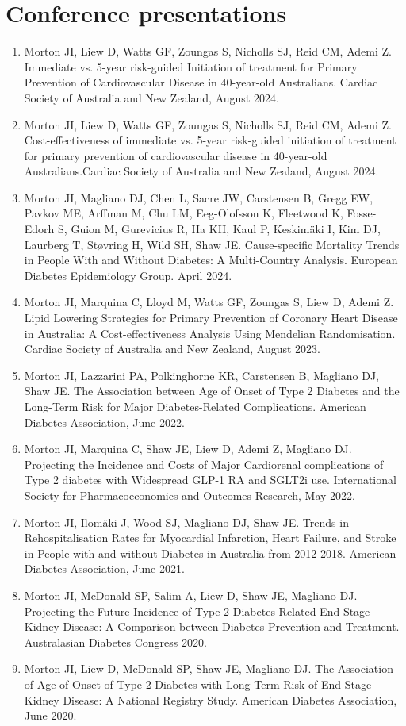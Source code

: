 \documentclass[11pt]{article}
\begin{document}
\section*{Conference presentations}
\begin{enumerate}
\item Morton JI, Liew D, Watts GF, Zoungas S, Nicholls SJ, Reid CM, Ademi Z.
Immediate vs. 5-year risk-guided Initiation of treatment for Primary Prevention of 
Cardiovascular Disease in 40-year-old Australians.
Cardiac Society of Australia and New Zealand, August 2024.
\item Morton JI, Liew D, Watts GF, Zoungas S, Nicholls SJ, Reid CM, Ademi Z.
Cost-effectiveness of immediate vs. 5-year risk-guided initiation of treatment for primary 
prevention of cardiovascular disease in 40-year-old Australians.Cardiac Society of Australia and New Zealand, August 2024.
\item Morton JI, Magliano DJ, Chen L, Sacre JW, Carstensen B, Gregg EW, Pavkov ME, Arffman M, 
Chu LM, Eeg-Olofsson K, Fleetwood K, Fosse-Edorh S, Guion M, Gurevicius R, Ha KH, Kaul P, 
Keskim{\"a}ki I, Kim DJ, Laurberg T, St{\o}vring H, Wild SH, Shaw JE. Cause-specific
Mortality Trends in People With and Without Diabetes: A Multi-Country Analysis. 
European Diabetes Epidemiology Group. April 2024.
\item Morton JI, Marquina C, Lloyd M, Watts GF, Zoungas S, Liew D, Ademi Z. 
Lipid Lowering Strategies for Primary Prevention of Coronary Heart Disease in Australia: 
A Cost-effectiveness Analysis Using Mendelian Randomisation. 
Cardiac Society of Australia and New Zealand, August 2023.
\item Morton JI, Lazzarini PA, Polkinghorne KR, Carstensen B, Magliano DJ, Shaw JE. 
The Association between Age of Onset of Type 2 Diabetes and the Long-Term Risk for Major Diabetes-Related Complications. 
American Diabetes Association, June 2022. 
\item Morton JI, Marquina C, Shaw JE, Liew D, Ademi Z, Magliano DJ. 
Projecting the Incidence and Costs of Major Cardiorenal complications of 
Type 2 diabetes with Widespread GLP-1 RA and SGLT2i use. 
International Society for Pharmacoeconomics and Outcomes Research, May 2022.
\item Morton JI, Ilom{\"a}ki J, Wood SJ, Magliano DJ, Shaw JE. 
Trends in Rehospitalisation Rates for Myocardial Infarction, Heart Failure, and Stroke in People with
and without Diabetes in Australia from 2012-2018. American Diabetes Association, June 2021.
\item Morton JI, McDonald SP, Salim A, Liew D, Shaw JE, Magliano DJ. 
Projecting the Future Incidence of Type 2 Diabetes-Related End-Stage Kidney Disease: 
A Comparison between Diabetes Prevention and Treatment. Australasian Diabetes Congress 2020.
\item Morton JI, Liew D, McDonald SP, Shaw JE, Magliano DJ. 
The Association of Age of Onset of Type 2 Diabetes with Long-Term Risk of End Stage Kidney Disease: 
A National Registry Study. American Diabetes Association, June 2020.  
\end{enumerate}
\end{document}
